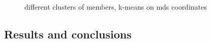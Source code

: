 \documentclass[a4paper,12pt]{article}
\begin{document}
\begin{figure}[!tbp]
		\hfill
		
		\caption{different clusters of members, \gls{k-means} on \acrshort{mds} coordinates}
	\end{figure}
	
	\clearpage
	
	\subsection{Results and conclusions}
	
\end{document}
